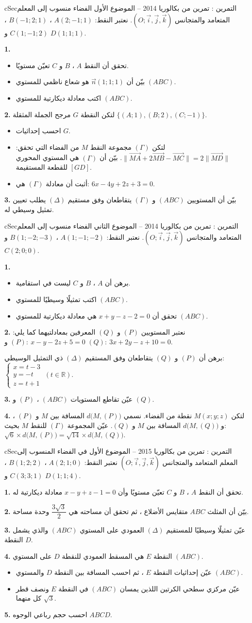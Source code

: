 \documentclass[12pt,a4paper]{article}
\newenvironment{BOX}[2]{\begin{otherlanguage}{english}\begin{arbox}{#1}{#2}}{\end{arbox}\end{otherlanguage}}
\newcounter{exo}
\newenvironment{tamrin}[1]{\stepcounter{exo}\begin{BOX}{cSec}{التمرين \theexo: #1}}{\end{BOX}}
\newcommand{\R}{\mathbb{R}}
\newenvironment{sq}{\begin{itemize}[leftmargin=2.4em,itemsep=3pt]}{\end{itemize}}
\newcommand{\qa}{\item[(أ)]}\newcommand{\qb}{\item[(ب)]}\newcommand{\qc}{\item[(جـ)]}\newcommand{\qd}{\item[(د)]}\newcommand{\qe}{\item[(هـ)]}
\newcommand{\QQ}[1]{\par\smallskip\textbf{#1.} }
\newcommand{\V}[1]{\overrightarrow{#1}}
\newcommand{\Rep}{(O;\vec i,\vec j,\vec k)}
\newcommand{\Sys}[1]{\left\{\begin{array}{l}#1\end{array}\right.}
\begin{document}
\begin{tamrin}{تمرين من بكالوريا 2014 -- الموضوع الأول}
الفضاء منسوب إلى المعلم المتعامد والمتجانس $\Rep$. نعتبر النقط: $A(2;-1;1)$ ، $B(-1;2;1)$ ، $C(1;-1;2)$ و $D(1;1;1)$.
\QQ{1}
\begin{sq}
\qa تحقق أن النقط $A$ ، $B$ و $C$ تعيّن مستويًا.
\qb بيّن أن $\vec n(1;1;1)$ هو شعاع ناظمي للمستوي $(ABC)$.
\qc اكتب معادلة ديكارتية للمستوي $(ABC)$.
\end{sq}
\QQ{2} لتكن النقطة $G$ مرجح الجملة المثقلة $\{(A;1),(B;2),(C;-1)\}$.
\begin{sq}
\qa احسب إحداثيات $G$.
\qb لتكن $(\Gamma)$ مجموعة النقط $M$ من الفضاء التي تحقق: $\big\|\V{MA}+2\V{MB}-\V{MC}\big\|=2\big\|\V{MD}\big\|$. بيّن أن $(\Gamma)$ هي المستوي المحوري للقطعة المستقيمة $[GD]$.
\qc أثبت أن معادلة $(\Gamma)$ هي: $6x-4y+2z+3=0$.
\end{sq}
\QQ{3} بيّن أن المستويين $(ABC)$ و $(\Gamma)$ يتقاطعان وفق مستقيم $(\Delta)$ يطلب تعيين تمثيل وسيطي له.
\end{tamrin}
\begin{tamrin}{تمرين من بكالوريا 2014 -- الموضوع الثاني}
الفضاء منسوب إلى المعلم المتعامد والمتجانس $\Rep$. نعتبر النقط: $A(1;-1;-2)$ ، $B(1;-2;-3)$ و $C(2;0;0)$.
\QQ{1}
\begin{sq}
\qa برهن أن $A$ ، $B$ و $C$ ليست في استقامية.
\qb اكتب تمثيلًا وسيطيًا للمستوي $(ABC)$.
\qc تحقق أن $x+y-z-2=0$ هي معادلة ديكارتية للمستوي $(ABC)$.
\end{sq}
\QQ{2} نعتبر المستويين $(P)$ و $(Q)$ المعرفين بمعادلتيهما كما يلي: $(P):\ x-y-2z+5=0$ و $(Q):\ 3x+2y-z+10=0$.
\par برهن أن $(P)$ و $(Q)$ يتقاطعان وفق المستقيم $(\Delta)$ ذي التمثيل الوسيطي: $\Sys{x=t-3\\y=-t\\z=t+1}\ (t\in\R)$.
\QQ{3} عيّن تقاطع المستويات $(ABC)$ ، $(P)$ و $(Q)$.
\QQ{4} لتكن $M(x;y;z)$ نقطة من الفضاء. نسمي $d\big(M,(P)\big)$ المسافة بين $M$ و $(P)$ ، و $d\big(M,(Q)\big)$ المسافة بين $M$ و $(Q)$. عيّن المجموعة $(\Gamma)$ للنقط $M$ بحيث: $\sqrt6\times d\big(M,(P)\big)=\sqrt{14}\times d\big(M,(Q)\big)$.
\end{tamrin}
\begin{tamrin}{تمرين من بكالوريا 2015 -- الموضوع الأول}
في الفضاء المنسوب إلى المعلم المتعامد والمتجانس $\Rep$ نعتبر النقط: $A(2;1;0)$ ، $B(1;2;2)$ ، $C(3;3;1)$ و $D(1;1;4)$.
\QQ{1} تحقق أن النقط $A$ ، $B$ و $C$ تعيّن مستويًا وأن $x-y+z-1=0$ معادلة ديكارتية له.
\QQ{2} بيّن أن المثلث $ABC$ متقايس الأضلاع ، ثم تحقق أن مساحته هي $\dfrac{3\sqrt3}2$ وحدة مساحة.
\QQ{3} عيّن تمثيلًا وسيطيًا للمستقيم $(\Delta)$ العمودي على المستوي $(ABC)$ والذي يشمل النقطة $D$.
\QQ{4} النقطة $E$ هي المسقط العمودي للنقطة $D$ على المستوي $(ABC)$.
\begin{sq}
\qa عيّن إحداثيات النقطة $E$ ، ثم احسب المسافة بين النقطة $D$ والمستوي $(ABC)$.
\qb عيّن مركزي سطحي الكرتين اللذين يمسان $(ABC)$ في النقطة $E$ ونصف قطر كل منهما $\sqrt3$.
\end{sq}
\QQ{5} احسب حجم رباعي الوجوه $ABCD$.
\end{tamrin}
\end{document}
